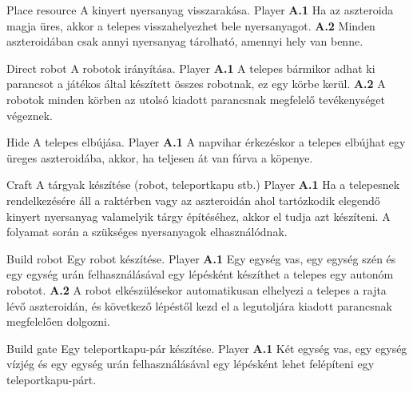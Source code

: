 \documentclass[../../projlab]{subfiles}
\begin{document}
\begin{use-case}
	{Place resource}
	{A kinyert nyersanyag visszarakása.}
	{Player}
    \textbf{A.1} Ha az aszteroida magja üres, akkor a telepes visszahelyezhet bele nyersanyagot.
	\newline
	\textbf{A.2} Minden aszteroidában csak annyi nyersanyag tárolható, amennyi hely van benne.
\end{use-case}

\begin{use-case}
	{Direct robot}
	{A robotok irányítása.}
	{Player}
    \textbf{A.1} A telepes bármikor adhat ki parancsot a játékos által készített összes robotnak, ez egy körbe kerül. 
	\newline
	\textbf{A.2} A robotok minden körben az utolsó kiadott parancsnak megfelelő tevékenységet végeznek.
\end{use-case}

\begin{use-case}
	{Hide}
	{A telepes elbújása.}
	{Player}
    \textbf{A.1} A napvihar érkezéskor a telepes elbújhat egy üreges aszteroidába, akkor, ha teljesen át van fúrva a köpenye.
\end{use-case}

\begin{use-case}
	{Craft}
	{A tárgyak készítése (robot, teleportkapu stb.)}
	{Player}
    \textbf{A.1} Ha a telepesnek rendelkezésére áll a raktérben vagy az aszteroidán ahol tartózkodik elegendő kinyert nyersanyag valamelyik tárgy építéséhez, akkor el tudja azt készíteni. A folyamat során a szükséges nyersanyagok elhasználódnak.
\end{use-case}

\begin{use-case}
	{Build robot}
	{Egy robot készítése.}
	{Player}
    \textbf{A.1} Egy egység vas, egy egység szén és egy egység urán felhasználásával egy lépésként készíthet a telepes egy autonóm robotot.
	\newline
	\textbf{A.2} A robot elkészülésekor automatikusan elhelyezi a telepes a rajta lévő aszteroidán, és következő lépéstől kezd el a legutoljára kiadott parancsnak megfelelően dolgozni.
\end{use-case}

\begin{use-case}
	{Build gate}
	{Egy teleportkapu-pár készítése.}
	{Player}
    \textbf{A.1} Két egység vas, egy egység vízjég és egy egység urán felhasználásával egy lépésként lehet felépíteni egy teleportkapu-párt.
\end{use-case}
\end{document}

